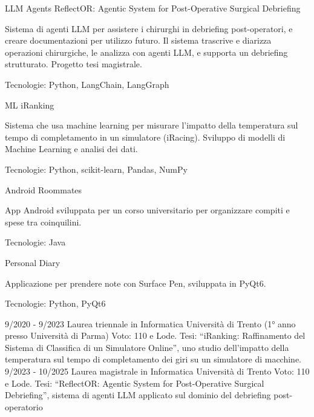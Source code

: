 \documentclass[9pt]{developercv} %
\begin{document}
\begin{entrylist}
    \entry
		{LLM Agents}
		{ReflectOR: Agentic System for Post-Operative Surgical Debriefing}
		{}
		{Sistema di agenti LLM per assistere i chirurghi in debriefing post-operatori, e creare documentazioni per utilizzo futuro. Il sistema trascrive e diarizza operazioni chirurgiche, le analizza con agenti LLM, e supporta un debriefing strutturato. Progetto tesi magistrale.

        Tecnologie: Python, LangChain, LangGraph}
	\entry
		{ML}
		{iRanking}
		{}
		{Sistema che usa machine learning per misurare l'impatto della temperatura sul tempo di completamento in un simulatore (iRacing). Sviluppo di modelli di Machine Learning e analisi dei dati.

        Tecnologie: Python, scikit-learn, Pandas, NumPy}
    \entry
		{Android}
		{Roommates}
		{}
		{App Android sviluppata per un corso universitario per organizzare compiti e spese tra coinquilini.

        Tecnologie: Java}
    \entry
		{Personal}
		{Diary}
		{}
		{Applicazione per prendere note con Surface Pen, sviluppata in PyQt6.

        Tecnologie: Python, PyQt6}
\end{entrylist}

\vspace{-10 pt}
\begin{entrylist}
    \entry
		{9/2020 - 9/2023}
		{Laurea triennale in Informatica}
		{Università di Trento (1° anno presso Università di Parma)}
		{Voto: 110 e Lode. Tesi: ``iRanking: Raffinamento del Sistema di Classifica di un Simulatore Online'', uno studio dell'impatto della temperatura sul tempo di completamento dei giri su un simulatore di macchine.}
	\entry
		{9/2023 - 10/2025}
		{Laurea magistrale in Informatica}
		{Università di Trento}
		{Voto: 110 e Lode. Tesi: ``ReflectOR: Agentic System for Post-Operative Surgical Debriefing'', sistema di agenti LLM applicato sul dominio del debriefing post-operatorio}
\end{entrylist}
\end{document}
